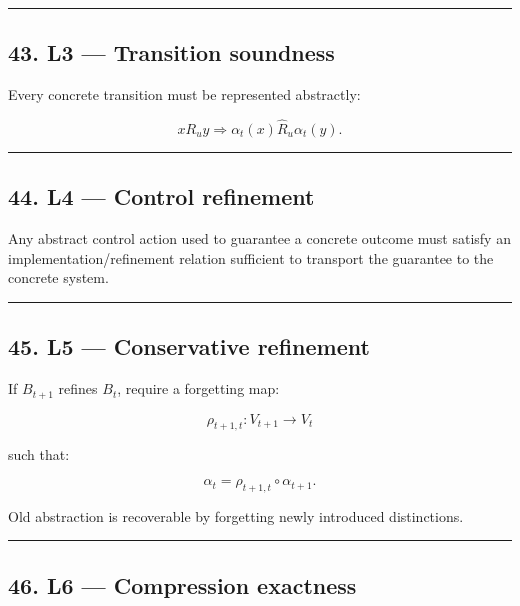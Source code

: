 \documentclass[
]{article}
\begin{document}
\begin{center}\rule{0.5\linewidth}{0.5pt}\end{center}

\subsection{43. L3 --- Transition
soundness}\label{l3-transition-soundness}

Every concrete transition must be represented abstractly:

\[
\boxed{
xR_uy
\Rightarrow
\alpha_t(x)\widehat R_u\alpha_t(y).
}
\]

\begin{center}\rule{0.5\linewidth}{0.5pt}\end{center}

\subsection{44. L4 --- Control refinement}\label{l4-control-refinement}

Any abstract control action used to guarantee a concrete outcome must
satisfy an implementation/refinement relation sufficient to transport
the guarantee to the concrete system.

\begin{center}\rule{0.5\linewidth}{0.5pt}\end{center}

\subsection{45. L5 --- Conservative
refinement}\label{l5-conservative-refinement}

If \(B_{t+1}\) refines \(B_t\), require a forgetting map:

\[
\boxed{
\rho_{t+1,t}
:
V_{t+1}\to V_t
}
\]

such that:

\[
\boxed{
\alpha_t
=
\rho_{t+1,t}\circ\alpha_{t+1}.
}
\]

Old abstraction is recoverable by forgetting newly introduced
distinctions.

\begin{center}\rule{0.5\linewidth}{0.5pt}\end{center}

\subsection{46. L6 --- Compression
exactness}\label{l6-compression-exactness}
\end{document}
